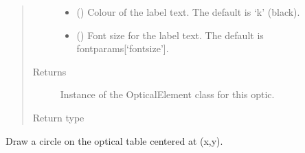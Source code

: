 \documentclass[letterpaper,10pt,english]{sphinxmanual}
\begin{document}
\begin{fulllineitems}
\begin{fulllineitems}
\begin{quote}
\begin{description}
\begin{itemize}
\item {} 
\sphinxAtStartPar
{} (\sphinxstyleliteralemphasis{\sphinxupquote{, }}) \textendash{} Colour of the label text. The default is ‘k’ (black).

\item {} 
\sphinxAtStartPar
{} (\sphinxstyleliteralemphasis{\sphinxupquote{, }}) \textendash{} Font size for the label text. The default is fontparams{[}‘fontsize’{]}.

\end{itemize}

\item[{Returns}] \leavevmode
\sphinxAtStartPar
Instance of the OpticalElement class for this optic.

\item[{Return type}] \leavevmode
\sphinxAtStartPar
{\hyperref[\detokenize{index:pyopticaltable.OpticalElement}]{}}

\end{description}\end{quote}

\end{fulllineitems}


\begin{fulllineitems}
\label{\detokenize{index:pyopticaltable.OpticalTable.generic_circle}}
\sphinxAtStartPar
Draw a circle on the optical table centered at (x,y).


\end{fulllineitems}
\end{fulllineitems}
\end{document}
